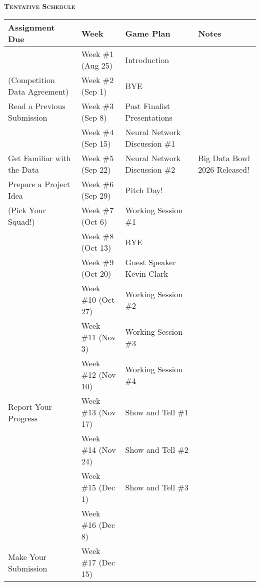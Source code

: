 \documentclass[11pt]{article}
\begin{document}
~\\
\textbf{\textsc{Tentative Schedule}}
\begin{center}
  \begin{tabular}{llll}
    Assignment Due                & Week                & Game Plan                     & Notes\\
    \hline
    \hline
                                  & Week \#1 (Aug 25)   & Introduction\\
    (Competition Data Agreement)  & Week \#2 (Sep 1)    & BYE\\
    Read a Previous Submission    & Week \#3 (Sep 8)    & Past Finalist Presentations\\
    \hline
                                  & Week \#4 (Sep 15)   & Neural Network Discussion \#1\\
    Get Familiar with the Data    & Week \#5 (Sep 22)   & Neural Network Discussion \#2 & Big Data Bowl 2026 Released!\\
    \hline
    Prepare a Project Idea        & Week \#6 (Sep 29)   & Pitch Day!\\
    (Pick Your Squad!)            & Week \#7 (Oct 6)    & Working Session \#1\\
    \hline
                                  & Week \#8 (Oct 13)   & BYE\\
                                  & Week \#9 (Oct 20)   & Guest Speaker -- Kevin Clark\\
                                  & Week \#10 (Oct 27)  & Working Session \#2\\
                                  & Week \#11 (Nov 3)   & Working Session \#3\\
                                  & Week \#12 (Nov 10)  & Working Session \#4\\
    Report Your Progress          & Week \#13 (Nov 17)  & Show and Tell \#1\\
                                  & Week \#14 (Nov 24)  & Show and Tell \#2\\
                                  & Week \#15 (Dec 1)   & Show and Tell \#3\\
    \hline
                                  & Week \#16 (Dec 8)   & \\
    Make Your Submission          & Week \#17 (Dec 15)  & \\
  \end{tabular}
\end{center}
\end{document}
